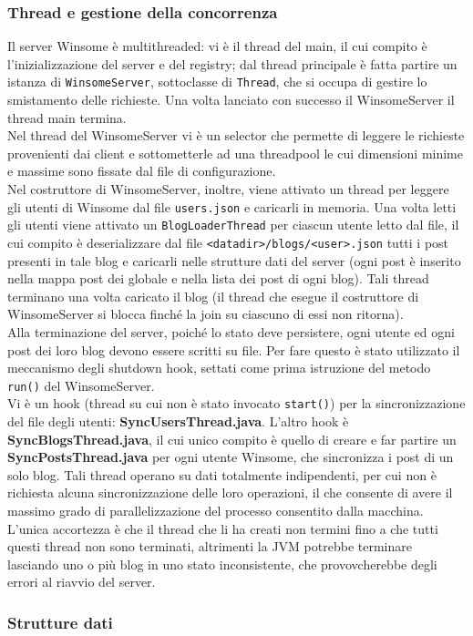 \subsubsection{Thread e gestione della concorrenza}
Il server Winsome è multithreaded: vi è il thread del main, il cui compito è l'inizializzazione del server e del registry; dal thread principale è fatta partire un istanza di \verb|WinsomeServer|, sottoclasse di \verb|Thread|, che si occupa di gestire lo smistamento delle richieste. Una volta lanciato con successo il WinsomeServer il thread main termina.\\
Nel thread del WinsomeServer vi è un selector che permette di leggere le richieste provenienti dai client e sottometterle ad una threadpool le cui dimensioni minime e massime sono fissate dal file di configurazione.\\
Nel costruttore di WinsomeServer, inoltre, viene attivato un thread per leggere gli utenti di Winsome dal file \verb|users.json| e caricarli in memoria. Una volta letti gli utenti viene attivato un \verb|BlogLoaderThread| per ciascun utente letto dal file, il cui compito è deserializzare dal file \verb|<datadir>/blogs/<user>.json| tutti i post presenti in tale blog e caricarli nelle strutture dati del server (ogni post è inserito nella mappa post dei globale e nella lista dei post di ogni blog). Tali thread terminano una volta caricato il blog (il thread che esegue il costruttore di WinsomeServer si blocca finché la join su ciascuno di essi non ritorna).\\
Alla terminazione del server, poiché lo stato deve persistere, ogni utente ed ogni post dei loro blog devono essere scritti su file. Per fare questo è stato utilizzato
il meccanismo degli shutdown hook, settati come prima istruzione del metodo \verb|run()| del WinsomeServer.\\
Vi è un hook (thread su cui non è stato invocato \verb|start()|) per la sincronizzazione del file degli utenti: \textbf{SyncUsersThread.java}. L'altro hook è \textbf{SyncBlogsThread.java}, il cui unico compito è quello di creare e far partire un \textbf{SyncPostsThread.java} per ogni utente Winsome, che sincronizza i post di un solo blog. Tali thread operano su dati totalmente indipendenti, per cui non è richiesta alcuna sincronizzazione delle loro operazioni, il che consente di avere il massimo grado di parallelizzazione del processo consentito dalla macchina. L'unica accortezza è che il thread che li ha creati non termini fino a che tutti questi thread non sono terminati, altrimenti la JVM potrebbe terminare lasciando uno o più blog in uno stato inconsistente, che provovcherebbe degli errori al riavvio del server.

\subsubsection{Strutture dati}